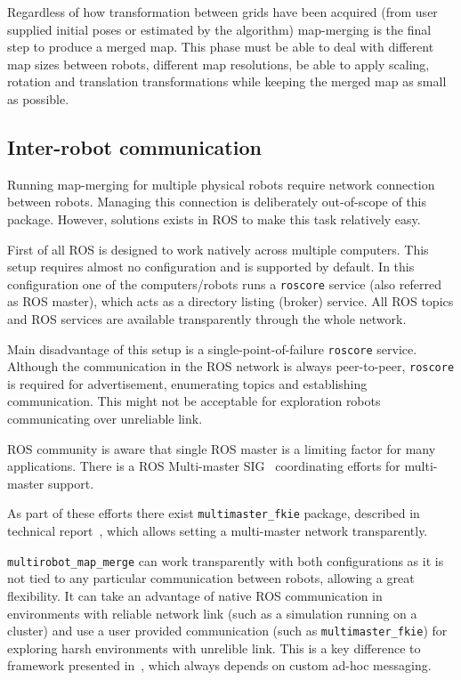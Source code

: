 Regardless of how transformation between grids have been acquired (from user supplied initial poses or estimated by the algorithm) map-merging is the final step to produce a merged map. This phase must be able to deal with different map sizes between robots, different map resolutions, be able to apply scaling, rotation and translation transformations while keeping the merged map as small as possible.

\subsection{Inter-robot communication}

Running map-merging for multiple physical robots require network connection between robots. Managing this connection is deliberately out-of-scope of this package. However, solutions exists in \gls{ROS} to make this task relatively easy.

First of all \gls{ROS} is designed to work natively across multiple computers. This setup requires almost no configuration and is supported by default. In this configuration one of the computers/robots runs a \texttt{roscore} service (also referred as \gls{ROS} master), which acts as a directory listing (broker) service. All \gls{ROS} topics and \gls{ROS} services are available transparently through the whole network.

Main disadvantage of this setup is a single-point-of-failure \texttt{roscore} service. Although the communication in the \gls{ROS} network is always peer-to-peer, \texttt{roscore} is required for advertisement, enumerating topics and establishing communication. This might not be acceptable for exploration robots communicating over unreliable link.

\gls{ROS} community is aware that single \gls{ROS} master is a limiting factor for many applications. There is a \gls{ROS} Multi-master \gls{SIG}~\cite{MultiMasterSIG} coordinating efforts for multi-master support.

As part of these efforts there exist \texttt{multimaster\_fkie} package, described in technical report~\cite{herrero2015multimaster}, which allows setting a multi-master network transparently.

\texttt{multirobot\_map\_merge} can work transparently with both configurations as it is not tied to any particular communication between robots, allowing a great flexibility. It can take an advantage of native \gls{ROS} communication in environments with reliable network link (such as a simulation running on a cluster) and use a user provided communication (such as \texttt{multimaster\_fkie}) for exploring harsh environments with unrelible link. This is a key difference to framework presented in~\cite{Andre2014}, which always depends on custom ad-hoc messaging.

